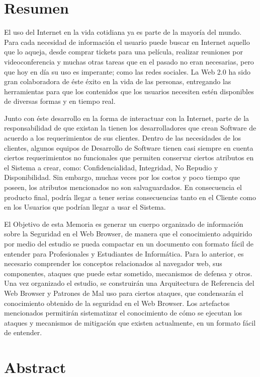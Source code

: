
\section*{Resumen}
\label{chap:resumen}

El uso del Internet en la vida cotidiana ya es parte de la mayoría del mundo. Para cada necesidad de información el usuario puede buscar en Internet aquello que lo aqueja, desde comprar tickets para una película, realizar reuniones por videoconferencia y muchas otras tareas que en el pasado no eran necesarias, pero que hoy en día su uso es imperante; como las redes sociales. La Web 2.0 ha sido gran colaboradora de éste éxito en la vida de las personas, entregando las herramientas para que los contenidos que los usuarios necesiten estén disponibles de diversas formas y en tiempo real.

Junto con éste desarrollo en la forma de interactuar con la Internet, parte de la responsabilidad de que existan la tienen los desarrolladores que crean Software de acuerdo a los requerimientos de sus clientes. Dentro de las necesidades de los clientes, algunos equipos de Desarrollo de Software tienen casi siempre en cuenta ciertos requerimientos no funcionales que permiten conservar ciertos atributos en el Sistema a crear, como: Confidencialidad, Integridad, No Repudio y Disponibilidad. Sin embargo, muchas veces por los costos y poco tiempo que poseen, los atributos mencionados no son salvaguardados. En consecuencia el producto final, podría llegar a tener serias consecuencias tanto en el Cliente como en los Usuarios que podrían llegar a usar el Sistema.

El Objetivo de esta Memoria es generar un cuerpo organizado de información sobre la Seguridad en el Web Browser, de manera que el conocimiento adquirido por medio del estudio se pueda compactar en un documento con formato fácil de entender para Profesionales y Estudiantes de Informática. Para lo anterior, es necesario comprender los conceptos relacionados al navegador web, sus componentes, ataques que puede estar sometido, mecanismos de defensa y otros. Una vez organizado el estudio, se construirán una Arquitectura de Referencia del Web Browser y Patrones de Mal uso para ciertos ataques, que condensarán el conocimiento obtenido de la seguridad en el Web Browser. Los artefactos mencionados permitirán sistematizar el conocimiento de cómo se ejecutan los ataques y mecanismos de mitigación que existen actualmente, en un formato fácil de entender.


\section*{Abstract}
\label{chap:abstract}


